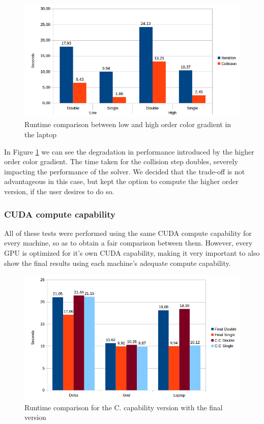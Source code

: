 \documentclass[12pt, openany]{book}
\begin{document}
  \begin{figure}[H]
  	\centering
  	\includegraphics[width=\linewidth]{Resources/Images/highlap.png}
  	\caption{Runtime comparison between low and high order color gradient in the laptop}
  	\label{fig:highLap}
  \end{figure}
  
  In Figure \ref{fig:highLap} we can see the degradation in performance introduced by the higher order color gradient. The time taken for the collision step doubles, severely impacting the performance of the solver. We decided that the trade-off is not advantageous in this case, but kept the option to compute the higher order version, if the user desires to do so. 

\subsubsection{CUDA compute capability}

All of these tests were performed using the same CUDA compute capability for every machine, so as to obtain a fair comparison between them. However, every GPU is optimized for it's own CUDA capability, making it very important to also show the final results using each machine's adequate compute capability.

  \begin{figure}[H]
  	\centering
  	\includegraphics[width=\linewidth]{Resources/Images/cc.png}
  	\caption{Runtime comparison for the C. capability version with the final version}
  	\label{fig:cc}
  \end{figure}
  
\end{document}
